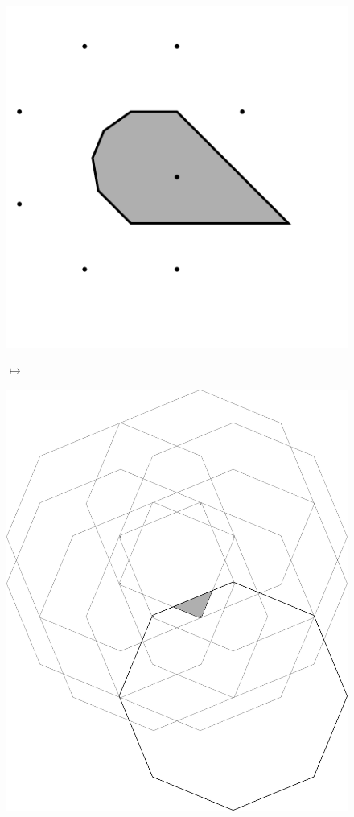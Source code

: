 \documentclass[text.tex]{subfiles}
\begin{document}
\begin{figure}[h!]
\begin{minipage}{0.4\textwidth}
\end{minipage}
\\[0.4cm]
\begin{minipage}{0.25\textwidth}
\includegraphics[width=\textwidth]{img/2D/intersectionTile02}
\end{minipage}
\qquad$\longmapsto$\qquad
\begin{minipage}{0.4\textwidth}
\includegraphics[width=\textwidth]{img/2D/intersection02}

\end{minipage}
\end{figure}
\end{document}
